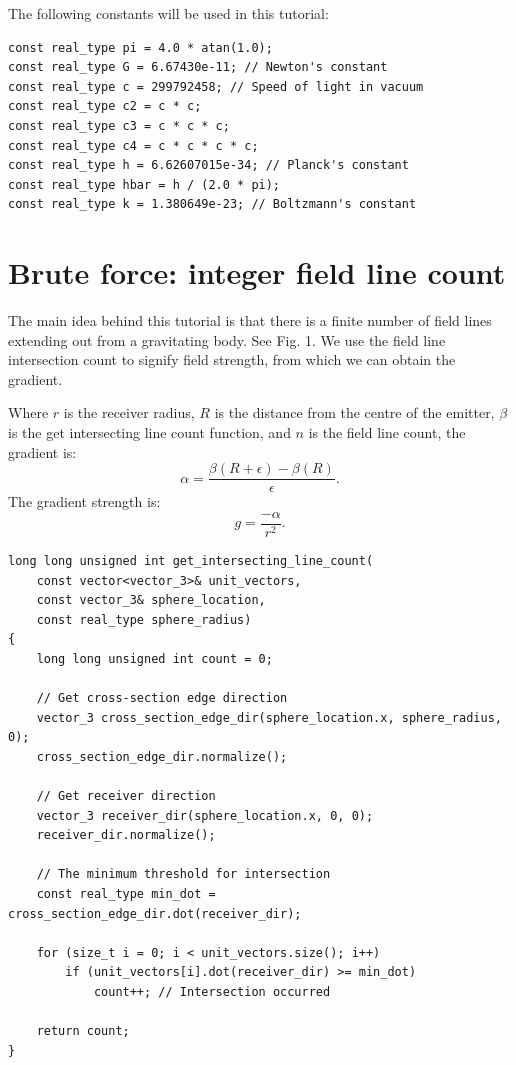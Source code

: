 \documentclass[12pt]{article}
\begin{document}
The following constants will be used in this tutorial:
\begin{lstlisting}
const real_type pi = 4.0 * atan(1.0);
const real_type G = 6.67430e-11; // Newton's constant
const real_type c = 299792458; // Speed of light in vacuum
const real_type c2 = c * c;
const real_type c3 = c * c * c;
const real_type c4 = c * c * c * c;
const real_type h = 6.62607015e-34; // Planck's constant
const real_type hbar = h / (2.0 * pi);
const real_type k = 1.380649e-23; // Boltzmann's constant
\end{lstlisting}



\section{Brute force: integer field line count}

The main idea behind this tutorial is that there is a finite number of field lines extending out from a gravitating body.
See Fig. 1.
We use the field line intersection count to signify field strength, from which we can obtain the gradient.

Where $r$ is the receiver radius, $R$ is the distance from the centre of the emitter, $\beta$ is the get intersecting line count function, and $n$ is the field line count, the gradient is:
\begin{equation}
\alpha = \frac{\beta(R + \epsilon) - \beta(R)}{\epsilon}.
\end{equation}
The gradient strength is:
\begin{equation}
g = \frac{-\alpha}{r^2}.
\end{equation}

\begin{lstlisting}
long long unsigned int get_intersecting_line_count(
	const vector<vector_3>& unit_vectors,
	const vector_3& sphere_location,
	const real_type sphere_radius)
{
	long long unsigned int count = 0;

	// Get cross-section edge direction
	vector_3 cross_section_edge_dir(sphere_location.x, sphere_radius, 0);
	cross_section_edge_dir.normalize();

	// Get receiver direction
	vector_3 receiver_dir(sphere_location.x, 0, 0);
	receiver_dir.normalize();

	// The minimum threshold for intersection
	const real_type min_dot = cross_section_edge_dir.dot(receiver_dir);

	for (size_t i = 0; i < unit_vectors.size(); i++)
		if (unit_vectors[i].dot(receiver_dir) >= min_dot)
			count++; // Intersection occurred

	return count;
}
\end{lstlisting}
\end{document}
